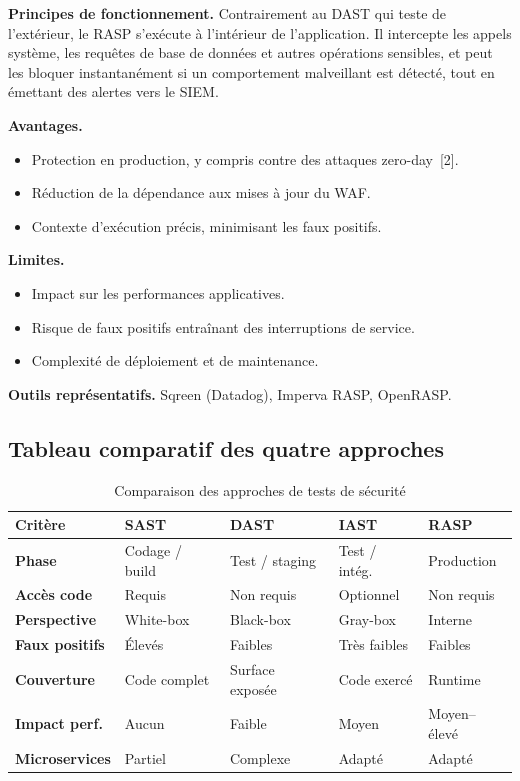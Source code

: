 \textbf{Principes de fonctionnement.} Contrairement au DAST qui teste de
l'extérieur, le RASP s'exécute à l'intérieur de l'application. Il intercepte
les appels système, les requêtes de base de données et autres opérations
sensibles, et peut les bloquer instantanément si un comportement malveillant est
détecté, tout en émettant des alertes vers le SIEM.

\textbf{Avantages.}
\begin{itemize}[leftmargin=*, topsep=2pt, itemsep=1pt]
  \item Protection en production, y compris contre des attaques zero-day~[2].
  \item Réduction de la dépendance aux mises à jour du WAF.
  \item Contexte d'exécution précis, minimisant les faux positifs.
\end{itemize}

\textbf{Limites.}
\begin{itemize}[leftmargin=*, topsep=2pt, itemsep=1pt]
  \item Impact sur les performances applicatives.
  \item Risque de faux positifs entraînant des interruptions de service.
  \item Complexité de déploiement et de maintenance.
\end{itemize}

\textbf{Outils représentatifs.} Sqreen (Datadog), Imperva RASP, OpenRASP.

\subsection{Tableau comparatif des quatre approches}

\begin{table}[H]
  \centering
  \caption{Comparaison des approches de tests de sécurité}
  \label{tab:comparaison-tests}
  \renewcommand{\arraystretch}{1.3}
  \begin{tabularx}{\textwidth}{>{\bfseries}lXXXX}
    \toprule
    \textbf{Critère} & \textbf{SAST} & \textbf{DAST} & \textbf{IAST} & \textbf{RASP} \\
    \midrule
    Phase         & Codage / build   & Test / staging  & Test / intég.  & Production \\
    Accès code    & Requis           & Non requis      & Optionnel      & Non requis \\
    Perspective   & White-box        & Black-box       & Gray-box       & Interne \\
    Faux positifs & Élevés           & Faibles         & Très faibles   & Faibles \\
    Couverture    & Code complet     & Surface exposée & Code exercé    & Runtime \\
    Impact perf.  & Aucun            & Faible          & Moyen          & Moyen--élevé \\
    Microservices & Partiel          & Complexe        & Adapté         & Adapté \\
    \bottomrule
  \end{tabularx}
\end{table}

